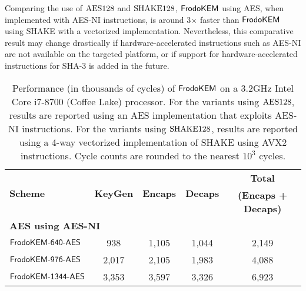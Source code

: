 Comparing the use of $\textrm{\upshape\mdseries AES128}$ and $\textrm{\upshape\mdseries SHAKE}128$, $\textsf{\upshape\mdseries FrodoKEM}$ using AES, when implemented with AES-NI instructions,
is around 3$\times$ faster than $\textsf{\upshape\mdseries FrodoKEM}$ using SHAKE with a vectorized implementation. Nevertheless, this comparative
result may change drastically if hardware-accelerated instructions such as AES-NI are not available on the
targeted platform, or if support for hardware-accelerated instructions for SHA-3 is added in the future. 

\begin{table}[t]
\caption{Performance (in thousands of cycles) of $\textsf{\upshape\mdseries FrodoKEM}$ on a 3.2GHz Intel Core i7-8700 (Coffee Lake) processor.
For the variants using $\textrm{\upshape\mdseries AES128}$, results are reported using an AES implementation that exploits AES-NI instructions. 
For the variants using $\textrm{\upshape\mdseries SHAKE}128$, results are reported using a 4-way vectorized implementation of SHAKE using AVX2 instructions.
Cycle counts are rounded to the nearest $10^3$ cycles.}\label{tab:results_x64}
\medskip
\centering
\renewcommand{\tabcolsep}{0.25cm}
\renewcommand{\arraystretch}{1.1}
\begin{tabular}{l|c c c|c}
\toprule
\multirow{2}{*}{\textbf{Scheme}}     &     \multirow{2}{*}{\textbf{KeyGen}}      &    \multirow{2}{*}{\textbf{Encaps}}   &    \multirow{2}{*}{\textbf{Decaps}}   &    \textbf{Total}        \\ 
                                   &                                             &                                       &
                                   &    \textbf{(Encaps + Decaps)}   \\
\midrule
\multicolumn{5}{l}{\bf AES using AES-NI} \\
\midrule
$\textsf{\upshape\mdseries FrodoKEM-640-AES}$                               &            938                &            1,105                   &                 1,044         &                2,149             \\
$\textsf{\upshape\mdseries FrodoKEM-976-AES}$                             &            2,017                &            2,105                   &                 1,983       &                4,088             \\
$\textsf{\upshape\mdseries FrodoKEM-1344-AES}$                             &            3,353                &            3,597                   &                 3,326       &                 6,923             \\

\end{tabular}
\end{table}
